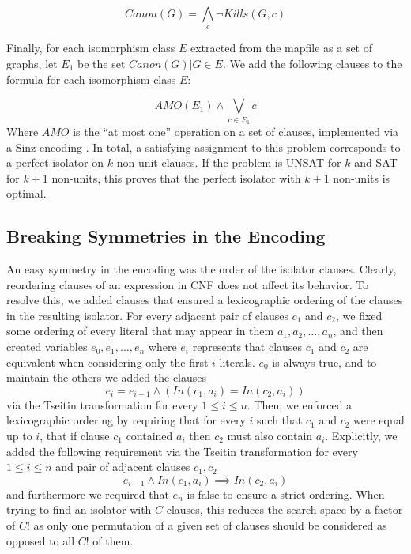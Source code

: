 \documentclass[a4paper,UKenglish,cleveref, autoref, thm-restate]{lipics-v2021}
\begin{document}
\begin{equation}
    Canon(G) = \bigwedge\limits_c \lnot Kills(G,c)
\end{equation}

Finally, for each isomorphism class $E$ extracted from the mapfile as a set of graphs, let $E_1$ be the set ${Canon(G) | G \in E}$. We add the following clauses to the formula for each isomorphism class $E$:

\begin{equation}
 AMO(E_1) \land \bigvee\limits_{c \in E_1} c
\end{equation}
Where $AMO$ is the ``at most one'' operation on a set of clauses, implemented via a Sinz encoding \cite{ref_sinz}. In total, a satisfying assignment to this problem corresponds to a perfect isolator on $k$ non-unit clauses. If the problem is UNSAT for $k$ and SAT for $k+1$ non-units, this proves that the perfect isolator with $k+1$ non-units is optimal.


\subsection{Breaking Symmetries in the Encoding}

An easy symmetry in the encoding was the order of the isolator clauses.  Clearly, reordering clauses of an expression in CNF does not affect its behavior.  To resolve this, we added clauses that ensured a lexicographic ordering of the clauses in the resulting isolator.  For every adjacent pair of clauses $c_1$ and $c_2$, we fixed some ordering of every literal that may appear in them $a_1, a_2, \dots, a_n$, and then created variables $e_0, e_1, \dots, e_n$ where $e_i$ represents that clauses $c_1$ and $c_2$ are equivalent when considering only the first $i$ literals.  $e_0$ is always true, and to maintain the others we added the clauses
$$e_i = e_{i-1} \land (In(c_1, a_i) = In(c_2, a_i))$$
via the Tseitin transformation for every $1 \le i \le n$.  Then, we enforced a lexicographic ordering by requiring that for every $i$ such that $c_1$ and $c_2$ were equal up to $i$, that if clause $c_1$ contained $a_i$ then $c_2$ must also contain $a_i$.  Explicitly, we added the following requirement via the Tseitin transformation for every $1 \le i \le n$ and pair of adjacent clauses $c_1, c_2$
$$e_{i-1} \land In(c_1, a_i) \implies In(c_2, a_i)$$
and furthermore we required that $e_n$ is false to ensure a strict ordering.  When trying to find an isolator with $C$ clauses, this reduces the search space by a factor of $C!$ as only one permutation of a given set of clauses should be considered as opposed to all $C!$ of them.
\end{document}
